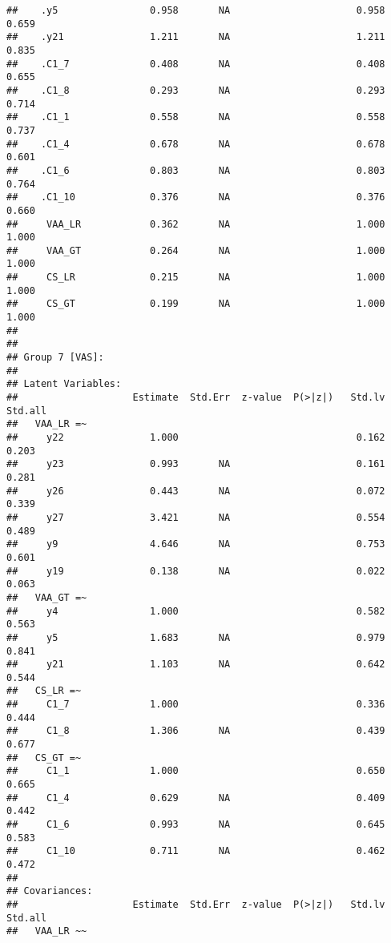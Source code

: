 \documentclass[
]{article}
\begin{document}
\begin{verbatim}
##    .y5                0.958       NA                      0.958    0.659
##    .y21               1.211       NA                      1.211    0.835
##    .C1_7              0.408       NA                      0.408    0.655
##    .C1_8              0.293       NA                      0.293    0.714
##    .C1_1              0.558       NA                      0.558    0.737
##    .C1_4              0.678       NA                      0.678    0.601
##    .C1_6              0.803       NA                      0.803    0.764
##    .C1_10             0.376       NA                      0.376    0.660
##     VAA_LR            0.362       NA                      1.000    1.000
##     VAA_GT            0.264       NA                      1.000    1.000
##     CS_LR             0.215       NA                      1.000    1.000
##     CS_GT             0.199       NA                      1.000    1.000
## 
## 
## Group 7 [VAS]:
## 
## Latent Variables:
##                    Estimate  Std.Err  z-value  P(>|z|)   Std.lv  Std.all
##   VAA_LR =~                                                             
##     y22               1.000                               0.162    0.203
##     y23               0.993       NA                      0.161    0.281
##     y26               0.443       NA                      0.072    0.339
##     y27               3.421       NA                      0.554    0.489
##     y9                4.646       NA                      0.753    0.601
##     y19               0.138       NA                      0.022    0.063
##   VAA_GT =~                                                             
##     y4                1.000                               0.582    0.563
##     y5                1.683       NA                      0.979    0.841
##     y21               1.103       NA                      0.642    0.544
##   CS_LR =~                                                              
##     C1_7              1.000                               0.336    0.444
##     C1_8              1.306       NA                      0.439    0.677
##   CS_GT =~                                                              
##     C1_1              1.000                               0.650    0.665
##     C1_4              0.629       NA                      0.409    0.442
##     C1_6              0.993       NA                      0.645    0.583
##     C1_10             0.711       NA                      0.462    0.472
## 
## Covariances:
##                    Estimate  Std.Err  z-value  P(>|z|)   Std.lv  Std.all
##   VAA_LR ~~                                                             

\end{verbatim}
\end{document}
